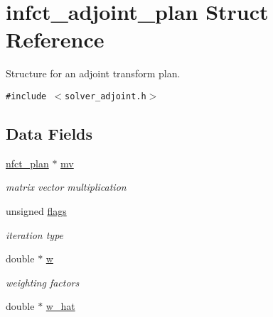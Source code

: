 \hypertarget{structinfct__adjoint__plan}{
\section{infct\_\-adjoint\_\-plan Struct Reference}
\label{structinfct__adjoint__plan}
}
Structure for an adjoint transform plan.  


{\tt \#include $<$solver\_\-adjoint.h$>$}

\subsection*{Data Fields}
\begin{CompactItemize}
\item 
\hypertarget{structinfct__adjoint__plan_65d97330deb4cd9de78e4b9aa85afa62}{
\hyperlink{structnfct__plan}{nfct\_\-plan} $\ast$ \hyperlink{structinfct__adjoint__plan_65d97330deb4cd9de78e4b9aa85afa62}{mv}}
\label{structinfct__adjoint__plan_65d97330deb4cd9de78e4b9aa85afa62}

\begin{CompactList}\small\item\em matrix vector multiplication \item\end{CompactList}\item 
\hypertarget{structinfct__adjoint__plan_d913ef9fc7d9bb8ca4f91f1abbf99949}{
unsigned \hyperlink{structinfct__adjoint__plan_d913ef9fc7d9bb8ca4f91f1abbf99949}{flags}}
\label{structinfct__adjoint__plan_d913ef9fc7d9bb8ca4f91f1abbf99949}

\begin{CompactList}\small\item\em iteration type \item\end{CompactList}\item 
\hypertarget{structinfct__adjoint__plan_dd093d84bfb7f6f5d5b5512e000efc68}{
double $\ast$ \hyperlink{structinfct__adjoint__plan_dd093d84bfb7f6f5d5b5512e000efc68}{w}}
\label{structinfct__adjoint__plan_dd093d84bfb7f6f5d5b5512e000efc68}

\begin{CompactList}\small\item\em weighting factors \item\end{CompactList}\item 
\hypertarget{structinfct__adjoint__plan_f14d4eb49aee59948ea57d30dbf4d628}{
double $\ast$ \hyperlink{structinfct__adjoint__plan_f14d4eb49aee59948ea57d30dbf4d628}{w\_\-hat}}
\label{structinfct__adjoint__plan_f14d4eb49aee59948ea57d30dbf4d628}


\end{CompactItemize}
